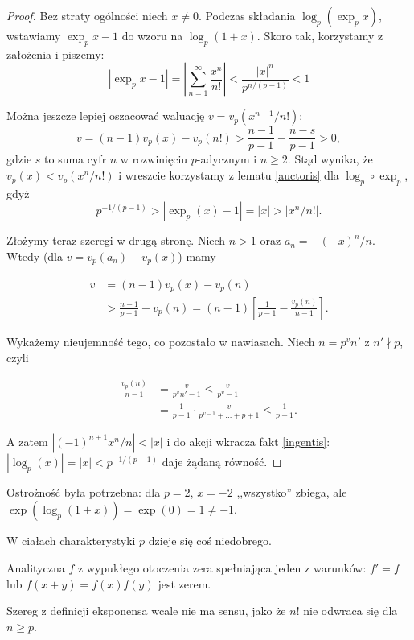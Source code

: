 \begin{proof}
	Bez straty ogólności niech $x \neq 0$.
	Podczas składania $\log_p(\exp_p x)$, wstawiamy $\exp_p x - 1$ do wzoru na $\log_p (1 + x)$.
	Skoro tak, korzystamy z założenia i piszemy:
	\[
		|\exp_p x - 1| = \left|\sum_{n=1}^\infty \frac {x^n}{n!} \right| < \frac{|x|^n}{p^{n / (p-1)}} < 1
	\]

	Można jeszcze lepiej oszacować waluację $v = v_p(x^{n-1} / n!)$:
	\[
		v = (n-1)v_p(x) - v_p(n!) > \frac{n-1}{p-1} - \frac{n-s}{p-1} > 0,
	\]
	gdzie $s$ to suma cyfr $n$ w rozwinięciu $p$-adycznym i $n \ge 2$.
	Stąd wynika, że $v_p(x) < v_p(x^n / n!)$ i wreszcie korzystamy z lematu \ref{auctoris} dla $\log_p \circ \exp_p$, gdyż
	\[
		p^{-1/(p-1)} > |\exp_p(x) - 1| = |x| > |x^n/n!|.
	\]

	Złożymy teraz szeregi w drugą stronę.
	Niech $n > 1$ oraz $a_n = - (-x)^n / n$.
	Wtedy (dla $v = v_p(a_n) - v_p(x)$) mamy
	
	\begin{align*}
		v & = (n-1) v_p(x) - v_p(n) \\
		& > \frac{n-1}{p-1} - v_p(n) = (n-1) \left[ \frac{1}{p-1} - \frac{v_p(n)}{n-1}\right].
	\end{align*}

	Wykażemy nieujemność tego, co pozostało w nawiasach.
	Niech $n = p^v n'$ z $n ' \nmid p$, czyli
	
	\begin{align*}
		\frac{v_p(n)}{n-1} & = \frac{v}{p^v n' -1 } \le \frac{v}{p^v - 1} \\
		& = \frac{1}{p-1} \cdot \frac{v}{p^{v-1} + \ldots + p + 1} \le \frac{1}{p-1}.
	\end{align*}

	A zatem $|(-1)^{n+1} x^n/n| < |x|$ i do akcji wkracza fakt \ref{ingentis}: $|\log_p(x)| = |x| < p^{-1/(p-1)}$ daje żądaną równość.
\end{proof}

Ostrożność była potrzebna: dla $p = 2$, $x = -2$ ,,wszystko'' zbiega, ale $\exp(\log_p(1+x)) = \exp(0) = 1 \neq -1$.

W ciałach charakterystyki $p$ dzieje się coś niedobrego.
\begin{fakt}
	Analityczna $f$ z wypukłego otoczenia zera spełniająca jeden z warunków: $f' = f$ lub $f(x+y) = f(x)f(y)$ jest zerem.
\end{fakt}

Szereg z definicji eksponensa wcale nie ma sensu, jako że $n!$ nie odwraca się dla $n \ge p$.